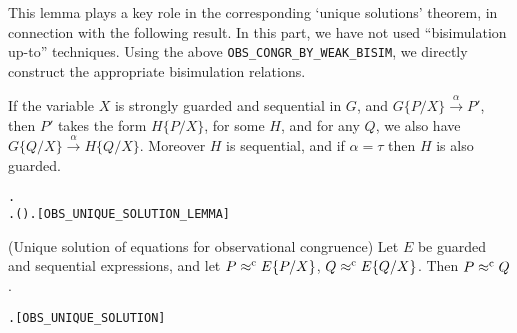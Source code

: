 This lemma plays a key role in the
corresponding `unique solutions' theorem, in connection with the
following result. 
In this part, we have not 
used 
 ``bisimulation up-to'' techniques. Using
 the  above \texttt{OBS_CONGR_BY_WEAK_BISIM},
 we  directly construct the appropriate bisimulation relations.
\begin{lemma}
If the variable $X$ is strongly guarded and sequential in $G$, and
$G\{P/X\}\overset{\alpha}{\rightarrow} P'$, then $P'$ takes the form
$H\{P/X\}$, for some  $H$, and for any $Q$, we also have 
$G\{Q/X\}\overset{\alpha}{\rightarrow} H\{Q/X\}$. Moreover $H$ is
sequential, and if $\alpha = \tau$ then $H$ is also guarded.
\begin{alltt}
\HOLTokenTurnstile{}   \HOLSymConst{\HOLTokenConj{}}   \HOLSymConst{\HOLTokenImp{}}
   \HOLSymConst{\HOLTokenForall{}}  .
         \HOLTokenTransBegin{}\HOLTokenTransEnd {} \HOLSymConst{\HOLTokenImp{}}
       \HOLSymConst{\HOLTokenExists{}}.   \HOLSymConst{\HOLTokenConj{}} ( \HOLSymConst{=} \HOLSymConst{\ensuremath{\tau}} \HOLSymConst{\HOLTokenImp{}}  ) \HOLSymConst{\HOLTokenConj{}}  \HOLSymConst{=}   \HOLSymConst{\HOLTokenConj{}} \HOLSymConst{\HOLTokenForall{}}.   \HOLTokenTransBegin{}\HOLTokenTransEnd {} \hfill{[OBS_UNIQUE_SOLUTION_LEMMA]}
\end{alltt}
\end{lemma}

\begin{theorem}{(Unique solution of equations for observational congruence)}
Let $E$ be guarded and sequential expressions, and let $P \mathrel{\approx^{\rm{c}}}
E\{P/X\}$,
$Q \mathrel{\approx^{\rm{c}}} E\{Q/X\}$. Then $P \mathrel{\approx^{\rm{c}}} Q$.
\begin{alltt}
\HOLTokenTurnstile{}   \HOLSymConst{\HOLTokenConj{}}   \HOLSymConst{\HOLTokenImp{}} \HOLSymConst{\HOLTokenForall{}} .  \HOLSymConst{\HOLTokenObsCongr}   \HOLSymConst{\HOLTokenConj{}}  \HOLSymConst{\HOLTokenObsCongr}   \HOLSymConst{\HOLTokenImp{}}  \HOLSymConst{\HOLTokenObsCongr} \hfill{[OBS_UNIQUE_SOLUTION]}
\end{alltt}
\end{theorem}

